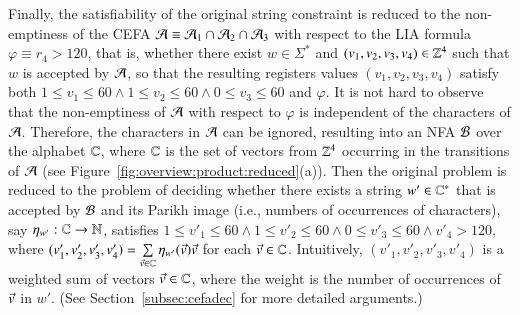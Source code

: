 Finally, the satisfiability of the original string constraint is reduced to the non-emptiness of the CEFA $\mathcal{A}\equiv \mathcal{A}_1 \cap \mathcal{A}_2 \cap \mathcal{A}_3$ with respect to the LIA formula $\varphi \equiv r_4 > 120$, that is, whether there exist $w \in \Sigma^*$ and $(v_1, v_2, v_3, v_4) \in \mathbb{Z}^4$ such that $w$ is accepted by $\mathcal{A}$, so that the resulting registers values $(v_1, v_2, v_3, v_4)$ satisfy both $1 \le v_1 \le 60\wedge 1 \le v_2 \le 60 \wedge 0 \le v_3 \le 60$ and $\varphi$. 
It is not hard to observe that the non-emptiness of $\mathcal{A}$ with respect to $\varphi$ is independent of the characters of $\mathcal{A}$.  Therefore, the characters in $\mathcal{A}$ can be ignored, resulting into an NFA $\mathcal{B}$ over the alphabet $\mathbb{C}$, where $\mathbb{C}$ is the set of vectors from $\mathbb{Z}^4$ occurring in the transitions of $\mathcal{A}$ (see Figure~\ref{fig:overview:product:reduced}(a)). Then the original problem is reduced to the problem of deciding whether there exists a string $w' \in \mathbb{C}^*$ that is accepted by $\mathcal{B}$ and its Parikh image (i.e., numbers of occurrences of characters), say $\eta_{w'}: \mathbb{C} \rightarrow \mathbb{N}$, satisfies $1 \le v'_1 \le 60\wedge 1 \le v'_2 \le 60 \wedge 0 \le v'_3 \le 60 \wedge v'_4 > 120$, where $(v'_1, v'_2, v'_3, v'_4) =  \sum \limits_{\vec{v} \in \mathbb{C}} \eta_{w'}(\vec{v}) \vec{v}$ for each $\vec{v}\in \mathbb{C}$. Intuitively, $(v'_1, v'_2, v'_3, v'_4)$ is a weighted sum of vectors $\vec{v} \in \mathbb{C}$, where the weight is the number of occurrences of $\vec{v}$ in $w'$. (See Section~\ref{subsec:cefadec} for more detailed arguments.)

